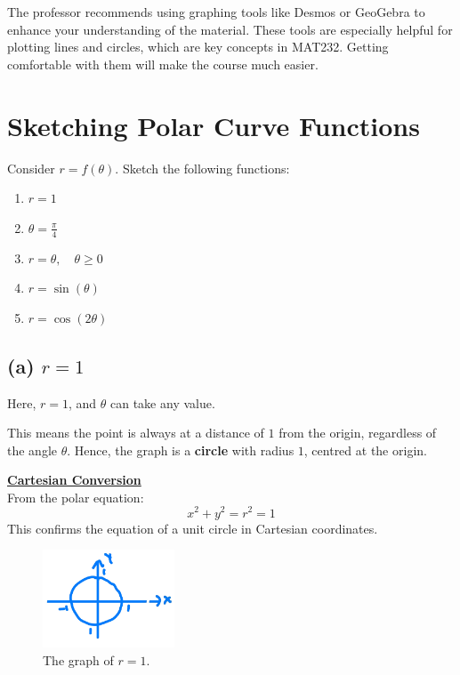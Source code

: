 \documentclass{article}
\begin{document}
\begin{notebox}
    The professor recommends using graphing tools like Desmos or GeoGebra to enhance your understanding of the material. These tools are especially helpful for plotting lines and circles, which are key concepts in MAT232. Getting comfortable with them will make the course much easier.
\end{notebox}

\section*{Sketching Polar Curve Functions}
\begin{exercisebox}
Consider \( r = f(\theta) \). Sketch the following functions: 
\begin{enumerate}[label=(\alph*)]
    \item \( r = 1 \)
    \item \( \theta = \frac{\pi}{4} \)
    \item \( r = \theta, \quad \theta \geq 0 \)
    \item \( r = \sin(\theta) \)
    \item \( r = \cos(2\theta) \)
\end{enumerate}
\end{exercisebox}

\subsection*{(a) \( r = 1 \)}
\begin{solutionbox}
Here, \( r = 1 \), and \( \theta \) can take any value. 

This means the point is always at a distance of \( 1 \) from the origin, regardless of the angle \( \theta \). Hence, the graph is a \textbf{circle} with radius \( 1 \), centred at the origin.

\begin{conceptbox}
    \textbf{\underline{Cartesian Conversion}} \\ 
    From the polar equation:
    \[
    x^2 + y^2 = r^2 = 1
    \]
    This confirms the equation of a unit circle in Cartesian coordinates.
\end{conceptbox}
\begin{figure}[H]
    \centering
    \includegraphics[width=0.35\textwidth]{polar curve sketch a.png}
    \caption{The graph of \( r = 1 \).}
    \label{fig:circle_graph}
\end{figure}
\end{solutionbox}
\end{document}
